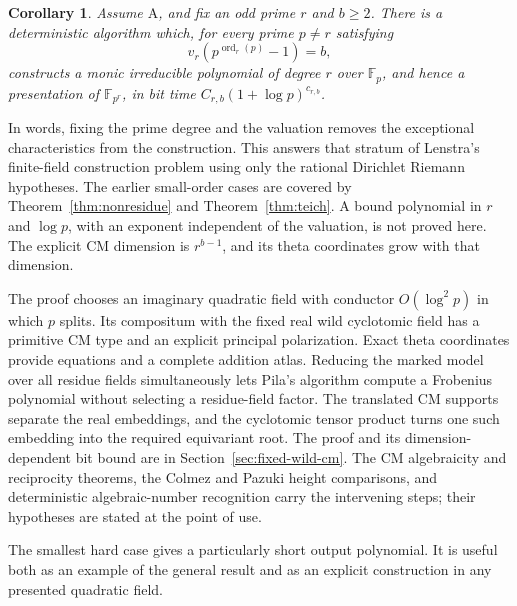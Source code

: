 \documentclass[11pt]{article}
\newtheorem{corollary}[theorem]{Corollary}
\theoremstyle{definition}
\theoremstyle{remark}
\begin{document}
\begin{corollary}\label{cor:fixed-wild-prime-degree-field}
Assume \(\mathrm A\), and fix an odd prime \(r\) and
\(b\geq2\). There is a deterministic algorithm which, for
every prime \(p\ne r\) satisfying
\[
                  v_r(p^{\operatorname{ord}_r(p)}-1)=b,
\]
constructs a monic irreducible polynomial of degree \(r\)
over \(\mathbb F_p\), and hence a presentation of
\(\mathbb F_{p^r}\), in bit time
\(C_{r,b}(1+\log p)^{c_{r,b}}\).
\end{corollary}

In words, fixing the prime degree and the valuation removes the
exceptional characteristics from the construction. This answers that
stratum of Lenstra's finite-field construction problem using only
the rational Dirichlet Riemann hypotheses. The earlier small-order
cases are covered by Theorem~\ref{thm:nonresidue} and
Theorem~\ref{thm:teich}. A bound polynomial in \(r\) and
\(\log p\), with an exponent independent of the valuation,
is not proved here. The explicit CM dimension is \(r^{b-1}\),
and its theta coordinates grow with that dimension.

The proof chooses an imaginary quadratic field with conductor
\(O(\log^2p)\) in which \(p\) splits. Its compositum with
the fixed real wild cyclotomic field has a primitive CM type and an
explicit principal polarization. Exact theta coordinates provide
equations and a complete addition atlas. Reducing the marked model
over all residue fields simultaneously lets Pila's algorithm compute
a Frobenius polynomial without selecting a residue-field factor.
The translated CM supports separate the real embeddings, and the
cyclotomic tensor product turns one such embedding into the required
equivariant root. The proof and its dimension-dependent bit bound
are in Section~\ref{sec:fixed-wild-cm}. The CM algebraicity and
reciprocity theorems, the Colmez and Pazuki height comparisons, and
deterministic algebraic-number recognition carry the intervening
steps; their hypotheses are stated at the point of use.

The smallest hard case gives a particularly short output polynomial.
It is useful both as an example of the general result and as an
explicit construction in any presented quadratic field.
\end{document}

